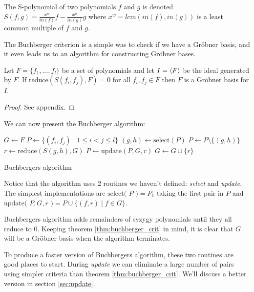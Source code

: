 \documentclass{article}
\theoremstyle{changedot}
\theoremstyle{changedotbreak}
\theoremstyle{nonumberplain}
\newtheorem{proof}{Proof}
\DeclarePairedDelimiter{\tuple}{\langle}{\rangle}
\begin{document}
\begin{definition}
  The S-polynomial of two polynomials $f$ and $g$ is denoted $S(f, g) = \frac{x^{w}}{in(f)} f - \frac{x^{w}}{in(g)} g$ where $x^{w} = lcm(in(f), in(g))$ is a least common multiple of $f$ and $g$.
\end{definition}

The Buchberger criterion is a simple was to check if we have a Gröbner basis, and it even leads us to an algorithm for constructing Gröbner bases.

\begin{theorem}\label{thm:buchberger_crit}
Let $F = \{f_{1}, \dots, f_{l}\}$ be a set of polynomials and let $I = \tuple F$ be the ideal generated by $F$. If $\text{reduce}(S(f_{i}, f_{j}), F) = 0$ for all $f_{i}, f_{j} \in F$ then $F$ is a Gröbner basis for $I$.
\end{theorem}
\begin{proof}
  See appendix.
\end{proof}

We can now present the Buchberger algorithm:

\begin{algorithm}[H]
\DontPrintSemicolon

  $G \leftarrow F$ \;
  $P \leftarrow \{(f_{i}, f_{j}) \mid 1 \leq i < j \leq l\}$ \;
  {
    $(g, h) \leftarrow \text{select}(P)$ \;
    $P \leftarrow P \setminus \{(g, h)\}$ \;
    $r \leftarrow \text{reduce}(S(g, h), G)$ \;
    {
      $P \leftarrow \text{update}(P, G, r)$ \;
      $G \leftarrow G \cup \{r\}$ \;
    }
  }

\caption{Buchbergers algorithm}
\end{algorithm}

Notice that the algorithm uses 2 routines we haven't defined: \emph{select} and \emph{update}. The simplest implementations are $\text{select( $P$ )} = P_{1}$ taking the first pair in $P$ and $\text{update( $P, G, r$ )} = P \cup \{(f, r) \mid f \in G\}$.

Buchbergers algorithm adds remainders of syzygy polynomials until they all reduce to 0. Keeping theorem \ref{thm:buchberger_crit} in mind, it is clear that $G$ will be a Gröbner basis when the algorithm terminates.

To produce a faster version of Buchbergers algorithm, these two routines are good places to start. During \emph{update} we can eliminate a large number of pairs using simpler criteria than theorem \ref{thm:buchberger_crit}. We'll discuss a better version in section \ref{sec:update}.
\end{document}
